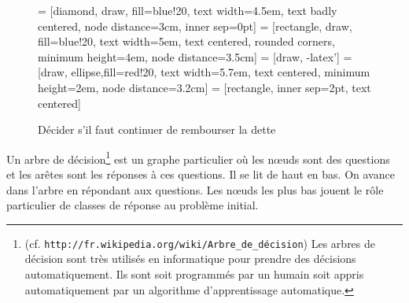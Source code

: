 \begin{figure}[h!]
    \begin{center}
 = [diamond, draw, fill=blue!20, 
    text width=4.5em, text badly centered, node distance=3cm, inner sep=0pt]
 = [rectangle, draw, fill=blue!20, 
    text width=5em, text centered, rounded corners, minimum height=4em, node distance=3.5cm]
 = [draw, -latex']
 = [draw, ellipse,fill=red!20,  text width=5.7em, text centered, 
    minimum height=2em,  node distance=3.2cm]
 = [rectangle, inner sep=2pt,
    text centered]
    
    \end{center}
    \caption{Décider s'il faut continuer de rembourser la dette}
    \label{fig:ad}
\end{figure}



Un arbre de décision\footnote{(cf.
  \texttt{http\hspace{-0.5em}://fr.wikipedia.org/wiki/Arbre\_de\_décision}) 
  Les arbres de décision
  sont très utilisés en informatique pour prendre des décisions
  automatiquement. Ils sont soit programmés par un humain soit appris
  automatiquement par un algorithme d'apprentissage automatique.} 
est un graphe particulier où les n\oe{}uds sont 
des questions et les arêtes sont les réponses à ces questions.
Il se lit de haut en bas. On avance dans l'arbre en répondant aux
questions. Les n{\oe}uds les plus bas jouent le rôle particulier de
classes de réponse au problème initial. 

